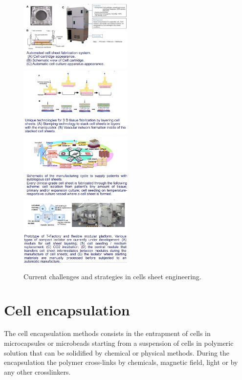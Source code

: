     \begin{figure}[H]
        \begin{multicols}{2}
            \includegraphics[width=0.5\textwidth]{strategies1.png}
            \includegraphics[width=0.5\textwidth]{strategies2.png}
            \includegraphics[width=0.5\textwidth]{strategies3.png}
            \includegraphics[width=0.5\textwidth]{strategies4.png}
        \end{multicols}
        \caption{\label{fig:strategies} Current challenges and strategies in cells sheet engineering.}
\end{figure}

\section{Cell encapsulation}

The cell encapsulation methods consists in the entrapment of cells in microcapsules or microbeads starting from a suspension of cells in polymeric solution that can be solidified by chemical or physical methods. During the encapsulation the polymer cross-links by chemicals, magnetic field, light or by any other crosslinkers.

